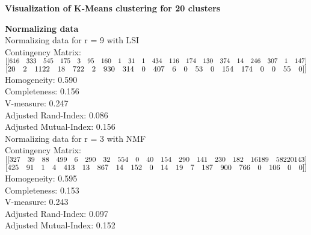 \documentclass{article}
\begin{document}
\textbf{Visualization of K-Means clustering for 20 clusters}\\
\begin{figure}[h]
	\centering
	\qquad
\end{figure}

\textbf{Normalizing data}\\
Normalizing data for r = 9 with LSI\\
Contingency Matrix:\\
$[[ 616 \quad 333 \quad 545 \quad 175 \quad   3  \quad 95 \quad 160  \quad  1 \quad  31 \quad   1 \quad 434 \quad 116 \quad 174 \quad 130\quad 374\quad   14 \quad 246 \quad 307 \quad   1 \quad 147]\\$
$[  20\quad    2\quad 1122 \quad  18\quad  722 \quad   2 \quad 930 \quad 314 \quad   0  \quad407 \quad   6 \quad   0  \quad 53\quad    0 \quad154 \quad 174 \quad   0\quad    0\quad   55 \quad   0]]\\$
Homogeneity: 0.590\\
Completeness: 0.156\\
V-measure: 0.247\\
Adjusted Rand-Index: 0.086\\
Adjusted Mutual-Index: 0.156\\

Normalizing data for r = 3 with NMF\\
Contingency Matrix:\\
$[[327 \quad 39\quad  88\quad 499 \quad  6 \quad290 \quad 32\quad 554\quad   0 \quad 40\quad 154 \quad290\quad 141 \quad230 \quad182 \quad 16 189\quad 582 201  43]\\$
$[425 \quad 91 \quad  1\quad   4 \quad413 \quad 13 \quad867 \quad 14 \quad152\quad   0\quad  14\quad  19\quad   7 \quad187\quad 900\quad 766 \quad  0 \quad106\quad0 \quad  0]]\\$
Homogeneity: 0.595\\
Completeness: 0.153\\
V-measure: 0.243\\
Adjusted Rand-Index: 0.097\\
Adjusted Mutual-Index: 0.152\\
\begin{figure}[h]
	\centering
	\qquad
\end{figure}
\end{document}
